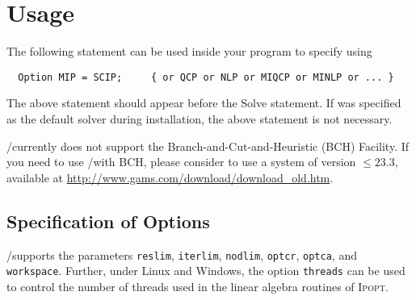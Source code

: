 \section{Usage}

The following statement can be used inside your \GAMS program to specify using \SCIP
\begin{verbatim}
  Option MIP = SCIP;     { or QCP or NLP or MIQCP or MINLP or ... }
\end{verbatim}

The above statement should appear before the Solve statement.
If \SCIP was specified as the default solver during \GAMS installation, the above statement is not necessary.

%

\GAMS/\SCIP currently does not support the \GAMS Branch-and-Cut-and-Heuristic (BCH) Facility.
If you need to use \GAMS/\SCIP with BCH, please consider to use a \GAMS system of version $\leq 23.3$, available at \url{http://www.gams.com/download/download_old.htm}.

\subsection{Specification of \SCIP Options}

\GAMS/\SCIP supports the \GAMS parameters \texttt{reslim}, \texttt{iterlim}, \texttt{nodlim}, \texttt{optcr}, \texttt{optca}, and \texttt{workspace}.
Further, under Linux and Windows, the option \texttt{threads} can be used to control the number of threads used in the linear algebra routines of \textsc{Ipopt}.

